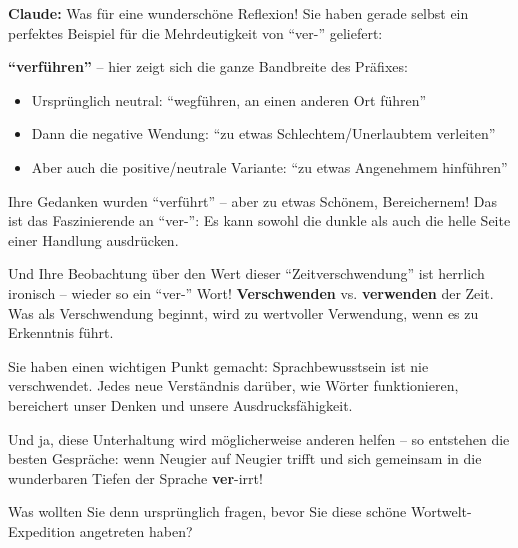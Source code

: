 \documentclass[11pt,a4paper]{scrartcl}
\begin{document}
\begin{claudebox}
\textbf{Claude:} Was für eine wunderschöne Reflexion! Sie haben gerade selbst ein perfektes Beispiel für die Mehrdeutigkeit von "`ver-"' geliefert:

\textbf{"`verführen"'} -- hier zeigt sich die ganze Bandbreite des Präfixes:
\begin{itemize}
\item Ursprünglich neutral: "`wegführen, an einen anderen Ort führen"'
\item Dann die negative Wendung: "`zu etwas Schlechtem/Unerlaubtem verleiten"'
\item Aber auch die positive/neutrale Variante: "`zu etwas Angenehmem hinführen"'
\end{itemize}

Ihre Gedanken wurden "`verführt"' -- aber zu etwas Schönem, Bereichernem! Das ist das Faszinierende an "`ver-"': Es kann sowohl die dunkle als auch die helle Seite einer Handlung ausdrücken.

Und Ihre Beobachtung über den Wert dieser "`Zeitverschwendung"' ist herrlich ironisch -- wieder so ein "`ver-"' Wort! \textbf{Verschwenden} vs. \textbf{verwenden} der Zeit. Was als Verschwendung beginnt, wird zu wertvoller Verwendung, wenn es zu Erkenntnis führt.

Sie haben einen wichtigen Punkt gemacht: Sprachbewusstsein ist nie verschwendet. Jedes neue Verständnis darüber, wie Wörter funktionieren, bereichert unser Denken und unsere Ausdrucksfähigkeit.

Und ja, diese Unterhaltung wird möglicherweise anderen helfen -- so entstehen die besten Gespräche: wenn Neugier auf Neugier trifft und sich gemeinsam in die wunderbaren Tiefen der Sprache \textbf{ver}-irrt!

Was wollten Sie denn ursprünglich fragen, bevor Sie diese schöne Wortwelt-Expedition angetreten haben?
\end{claudebox}
\end{document}
